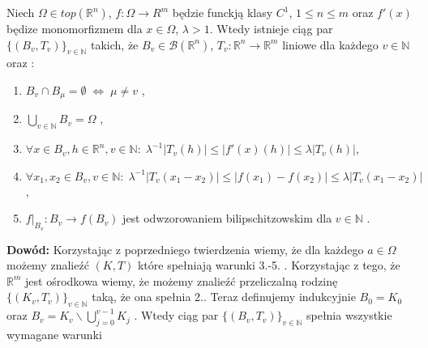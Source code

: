 \begin{lem}
	Niech $\Omega \in top(\mathbb{R}^n)$, $f: \Omega \rightarrow \mathbb{}R^m$  będzie funckją klasy $C^1$, $1 \leq n \leq m$ oraz $f'(x)$ będize monomorfizmem dla $x \in \Omega$, $\lambda > 1$. Wtedy istnieje ciąg par $\{(B_v, T_v)\}_{v \in \mathbb{N}}$ takich, że $B_v \in \mathcal{B}(\mathbb{R}^n)$, $T_v: \mathbb{R}^n \rightarrow \mathbb{R}^m$ liniowe dla każdego $v \in \mathbb{N}$ oraz :
	\begin{enumerate}
		\item $B_v \cap B_{\mu} = \emptyset \; \Leftrightarrow \; \mu \neq v$ ,
		\item $\bigcup_{v \in \mathbb{N}} B_v = \Omega$ ,
		\item $\forall x \in B_v, h \in \mathbb{R}^n, v \in \mathbb{N}: \; \lambda^{-1}|T_v(h)| \leq |f'(x)(h)| \leq \lambda|T_v(h)|$,
		\item $\forall x_1, x_2 \in B_v, v \in \mathbb{N}: \; \lambda^{-1}|T_v(x_1 - x_2)| \leq |f(x_1) - f(x_2)| \leq \lambda|T_v(x_1 - x_2)|$,
		\item $f|_{B_v}: B_v \rightarrow f(B_v)$ jest odwzorowaniem bilipschitzowskim dla $v \in \mathbb{N}$ .
	\end{enumerate}

	\textbf{Dowód:}\newline
	Korzystając z poprzedniego twierdzenia wiemy, że dla każdego $a \in \Omega$ możemy znalieźć $(K, T)$ które spełniają warunki 3.-5. . Korzystając z tego, że $\mathbb{R}^m$ jest ośrodkowa wiemy, że możemy znalieźć przeliczalną rodzinę $\{(K_v, T_v)\}_{v \in \mathbb{N}}$ taką, że ona spełnia 2.. Teraz definujemy indukcyjnie $B_0 = K_0$ oraz $B_v = K_{v} \backslash \bigcup_{j=0}^{v-1} K_j$ . Wtedy ciąg par $\{(B_v, T_v)\}_{v \in \mathbb{N}}$ spełnia wszystkie wymagane warunki
\end{lem}